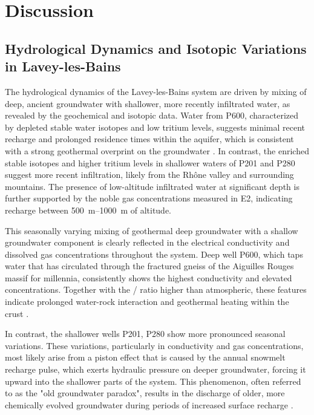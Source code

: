 
\section{Discussion}
\subsection{Hydrological Dynamics and Isotopic Variations in Lavey-les-Bains}
The hydrological dynamics of the Lavey-les-Bains system are driven by mixing of deep, ancient groundwater with shallower, more recently infiltrated water, as revealed by the geochemical and isotopic data.
Water from P600, characterized by depleted stable water isotopes and low tritium levels, suggests minimal recent recharge and prolonged residence times within the aquifer, which is consistent with a strong geothermal overprint on the groundwater \citep{sonney2009numerical, vuataz1982hydrogeologie}.
In contrast, the enriched stable isotopes and higher tritium levels in shallower waters of P201 and P280 suggest more recent infiltration, likely from the Rhône valley and surrounding mountains.
The presence of low-altitude infiltrated water at significant depth is further supported by the noble gas concentrations measured in E2, indicating recharge between \SIrange[range-phrase = { and }]{500}{1000}{\meter} of altitude.

This seasonally varying mixing of geothermal deep groundwater with a shallow groundwater component is clearly reflected in the electrical conductivity and dissolved gas concentrations throughout the system.
Deep well P600, which taps water that has circulated through the fractured gneiss of the Aiguilles Rouges massif for millennia, consistently shows the highest conductivity and elevated  concentrations.
Together with the / ratio higher than atmospheric, these features indicate prolonged water-rock interaction and geothermal heating within the crust \citep{torgersen1982helium}.

In contrast, the shallower wells P201, P280 show more pronounced seasonal variations.
These variations, particularly in conductivity and gas concentrations, most likely arise from a piston effect that is caused by the annual snowmelt recharge pulse, which exerts hydraulic pressure on deeper groundwater, forcing it upward into the shallower parts of the system.
This phenomenon, often referred to as the "old groundwater paradox", results in the discharge of older, more chemically evolved groundwater during periods of increased surface recharge \citep{schilling2021quantifying, mcdonnell2003where, kirchner2003double}.

